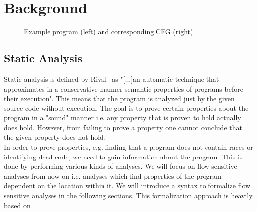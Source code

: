 
\chapter{Background}\label{chapter:background}

\begin{figure}
  \centering
  \begin{subfigure}{.35\textwidth}
    \centering
    
  \end{subfigure}
  \begin{subfigure}{.35\textwidth}
    \centering
  \end{subfigure}
  \caption{Example program (left) and corresponding CFG (right)}
  \label{fig:example_cfg}
\end{figure}

  \section{Static Analysis}
  Static analysis is defined by Rival~\parencite{rival2020introduction} as "[...]an automatic technique that approximates in a conservative manner semantic properties of programs before their execution". This means that the program is analyzed just by the given source code without execution. The goal is to prove certain properties about the program in a "sound" manner i.e. any property that is proven to hold actually does hold. However, from failing to prove a property one cannot conclude that the given property does not hold.\\
  In order to prove properties, e.g. finding that a program does not contain races or identifying dead code, we need to gain information about the program. This is done by performing various kinds of analyses. We will focus on flow sensitive analyses from now on i.e. analyses which find properties of the program dependent on the location within it. We will introduce a syntax to formalize flow sensitive analyses in the following sections. This formalization approach is heavily based on \parencite{apinis2012side}.
    
